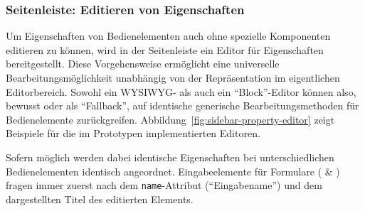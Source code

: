 \subsubsection{Seitenleiste: Editieren von Eigenschaften}

Um Eigenschaften von Bedienelementen auch ohne spezielle Komponenten editieren zu können, wird in der Seitenleiste ein Editor für Eigenschaften bereitgestellt. Diese Vorgehensweise ermöglicht eine universelle Bearbeitungsmöglichkeit unabhängig von der Repräsentation im eigentlichen Editorbereich. Sowohl ein WYSIWYG- als auch ein "`Block"'-Editor können also, bewusst oder als "`Fallback"', auf identische generische Bearbeitungsmethoden für Bedienelemente zurückgreifen. Abbildung~\ref{fig:sidebar-property-editor} zeigt Beispiele für die im Prototypen implementierten Editoren.

Sofern möglich werden dabei identische Eigenschaften bei unterschiedlichen Bedienelementen identisch angeordnet. Eingabeelemente für Formulare ( \& ) fragen immer zuerst nach dem \texttt{name}-Attribut ("`Eingabename"') und dem dargestellten Titel des editierten Elements.

